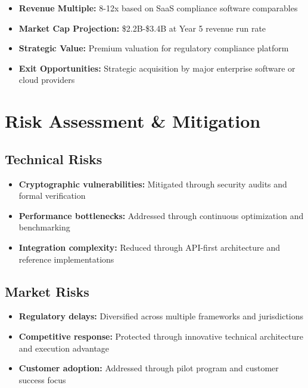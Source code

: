 \documentclass[12pt,a4paper]{article}
\begin{document}
\begin{itemize}
    \item \textbf{Revenue Multiple:} 8-12x based on SaaS compliance software comparables
    \item \textbf{Market Cap Projection:} \$2.2B-\$3.4B at Year 5 revenue run rate
    \item \textbf{Strategic Value:} Premium valuation for regulatory compliance platform
    \item \textbf{Exit Opportunities:} Strategic acquisition by major enterprise software or cloud providers
\end{itemize}

\section{Risk Assessment \& Mitigation}

\begin{riskbox}
\subsection{Technical Risks}
\begin{itemize}
    \item \textbf{Cryptographic vulnerabilities:} Mitigated through security audits and formal verification
    \item \textbf{Performance bottlenecks:} Addressed through continuous optimization and benchmarking
    \item \textbf{Integration complexity:} Reduced through API-first architecture and reference implementations
\end{itemize}
\end{riskbox}

\begin{riskbox}
\subsection{Market Risks}
\begin{itemize}
    \item \textbf{Regulatory delays:} Diversified across multiple frameworks and jurisdictions
    \item \textbf{Competitive response:} Protected through innovative technical architecture and execution advantage
    \item \textbf{Customer adoption:} Addressed through pilot program and customer success focus
\end{itemize}
\end{riskbox}
\end{document}
